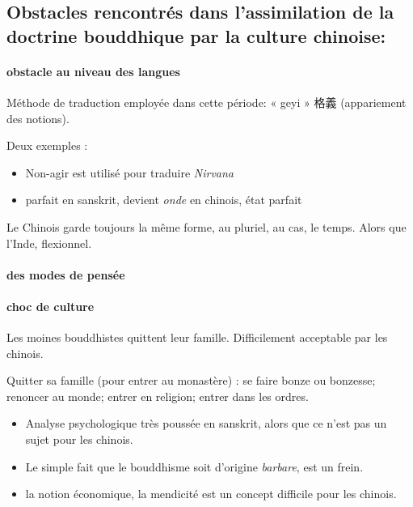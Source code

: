  \subsection{Obstacles rencontrés dans l’assimilation de la doctrine bouddhique par la culture chinoise:}

 
 \paragraph{obstacle au niveau des langues }	
Méthode de traduction employée dans cette période: « geyi » 	格義  (appariement des notions). 

Deux exemples :
\begin{itemize}
    \item Non-agir est utilisé pour traduire \textit{Nirvana}
    \item parfait en sanskrit, devient \textit{onde} en chinois, état parfait
    
\end{itemize}
Le Chinois garde toujours la même forme, au pluriel, au cas, le temps. Alors que l'Inde, flexionnel.
 \paragraph{des modes de pensée}



 
 


\paragraph{choc de culture} Les moines bouddhistes quittent leur famille. Difficilement acceptable par les chinois.

\begin{Def}[chujia 出家]
     Quitter sa famille (pour entrer au monastère) : se faire bonze ou bonzesse; renoncer au monde; entrer en religion; entrer dans les ordres. 
\end{Def}
\begin{itemize}
    \item Analyse psychologique très poussée en sanskrit, alors que ce n'est pas un sujet pour les chinois. 
    \item Le simple fait que le bouddhisme soit d'origine \textit{barbare}, est un frein. 
    \item la notion économique, la mendicité est un concept difficile pour les chinois.
\end{itemize}

